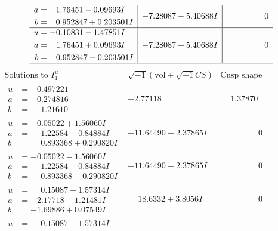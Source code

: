 \documentclass[1p]{elsarticle_modified}
\theoremstyle{definition}
\newcommand{\I}{\sqrt{-1}}
\begin{document}
$$\begin{array}{c|c|c}
\begin{aligned}
a &= \phantom{-}1.76451 - 0.09693 I \\
b &= \phantom{-}0.952847 + 0.203501 I\end{aligned}
 & -7.28087 - 5.40688 I & \phantom{-0.000000 } 0 \\ \hline\begin{aligned}
u &= -0.10831 - 1.47851 I \\
a &= \phantom{-}1.76451 + 0.09693 I \\
b &= \phantom{-}0.952847 - 0.203501 I\end{aligned}
 & -7.28087 + 5.40688 I & \phantom{-0.000000 } 0\\
 \hline 
 \end{array}$$\newpage$$\begin{array}{c|c|c}  
\text{Solutions to }I^u_{1}& \I (\text{vol} + \sqrt{-1}CS) & \text{Cusp shape}\\
 \hline 
\begin{aligned}
u &= -0.497221\phantom{ +0.000000I} \\
a &= -0.274816\phantom{ +0.000000I} \\
b &= \phantom{-}1.21610\phantom{ +0.000000I}\end{aligned}
 & -2.77118\phantom{ +0.000000I} & \phantom{-}1.37870\phantom{ +0.000000I} \\ \hline\begin{aligned}
u &= -0.05022 + 1.56060 I \\
a &= \phantom{-}1.22584 - 0.84884 I \\
b &= \phantom{-}0.893368 + 0.290820 I\end{aligned}
 & -11.64490 - 2.37865 I & \phantom{-0.000000 } 0 \\ \hline\begin{aligned}
u &= -0.05022 - 1.56060 I \\
a &= \phantom{-}1.22584 + 0.84884 I \\
b &= \phantom{-}0.893368 - 0.290820 I\end{aligned}
 & -11.64490 + 2.37865 I & \phantom{-0.000000 } 0 \\ \hline\begin{aligned}
u &= \phantom{-}0.15087 + 1.57314 I \\
a &= -2.17718 - 1.21481 I \\
b &= -1.69886 + 0.07549 I\end{aligned}
 & \phantom{-}18.6332 + 3.8056 I & \phantom{-0.000000 } 0 \\ \hline\begin{aligned}
u &= \phantom{-}0.15087 - 1.57314 I \\

\end{aligned}
\end{array}$$
\end{document}
